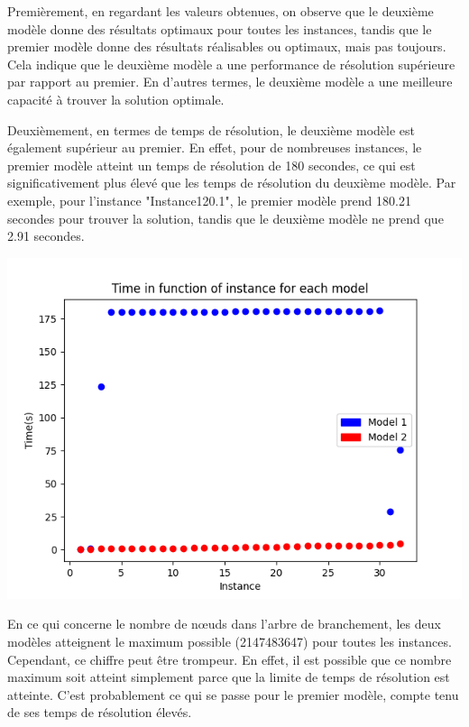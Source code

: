\documentclass[10pt]{article}
\begin{document}
Premièrement, en regardant les valeurs obtenues, on observe que le deuxième modèle donne des résultats optimaux pour toutes les instances, tandis que le premier modèle donne des résultats réalisables ou optimaux, mais pas toujours. Cela indique que le deuxième modèle a une performance de résolution supérieure par rapport au premier. En d'autres termes, le deuxième modèle a une meilleure capacité à trouver la solution optimale.

Deuxièmement, en termes de temps de résolution, le deuxième modèle est également supérieur au premier. En effet, pour de nombreuses instances, le premier modèle atteint un temps de résolution de 180 secondes, ce qui est significativement plus élevé que les temps de résolution du deuxième modèle. Par exemple, pour l'instance "Instance120.1", le premier modèle prend 180.21 secondes pour trouver la solution, tandis que le deuxième modèle ne prend que 2.91 secondes.

\begin{center}
\includegraphics[max width=\textwidth]{9D8x0pnOb04nH-VZ__k-QFB-TwYsvFdQ5S8UGUK4j30_original_fullsize}
\end{center}

En ce qui concerne le nombre de nœuds dans l'arbre de branchement, les deux modèles atteignent le maximum possible (2147483647) pour toutes les instances. Cependant, ce chiffre peut être trompeur. En effet, il est possible que ce nombre maximum soit atteint simplement parce que la limite de temps de résolution est atteinte. C'est probablement ce qui se passe pour le premier modèle, compte tenu de ses temps de résolution élevés.
\end{document}
